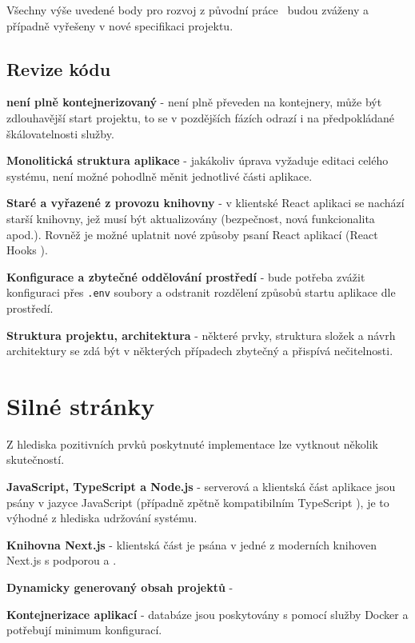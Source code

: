 Všechny výše uvedené body pro rozvoj z původní práce~\cite{bachelorthesis} budou zváženy a případně vyřešeny v nové specifikaci projektu.



\subsection{Revize kódu}

\begin{ul}
   \item
   \textbf{ není plně kontejnerizovaný} -  není plně převeden na kontejnery, může být zdlouhavější start projektu, to se v pozdějších fázích odrazí i na předpokládané škálovatelnosti služby.
   \item
   \textbf{Monolitická struktura aplikace} - jakákoliv úprava vyžaduje editaci celého systému, není možné pohodlně měnit jednotlivé části aplikace.
   \item
   \textbf{Staré a vyřazené z provozu knihovny} - v klientské React aplikaci se nachází starší knihovny, jež musí být aktualizovány (bezpečnost, nová funkcionalita apod.).
   Rovněž je možné uplatnit nové způsoby psaní React aplikací (React Hooks ).
   \item
   \textbf{Konfigurace a zbytečné oddělování prostředí} - bude potřeba zvážit konfiguraci přes \texttt{.env} soubory  a odstranit rozdělení způsobů startu aplikace dle prostředí.
   \item
   \textbf{Struktura projektu, architektura} - některé prvky, struktura složek a návrh architektury se zdá být v některých případech zbytečný a přispívá nečitelnosti.
\end{ul}



\section{Silné stránky}
Z hlediska pozitivních prvků poskytnuté implementace lze vytknout několik skutečností.

\begin{ul}
   \item
   \textbf{JavaScript, TypeScript a Node.js} - serverová a klientská část aplikace jsou psány v jazyce JavaScript (případně zpětně kompatibilním TypeScript ), je to výhodné z hlediska udržování systému.
   \item
   \textbf{Knihovna Next.js} - klientská část je psána v jedné z moderních knihoven Next.js s podporou  a  .
   \item
   \textbf{Dynamicky generovaný obsah projektů} -
   \item
   \textbf{Kontejnerizace aplikací} - databáze jsou poskytovány s pomocí služby Docker  a potřebují minimum konfigurací.
\end{ul}



